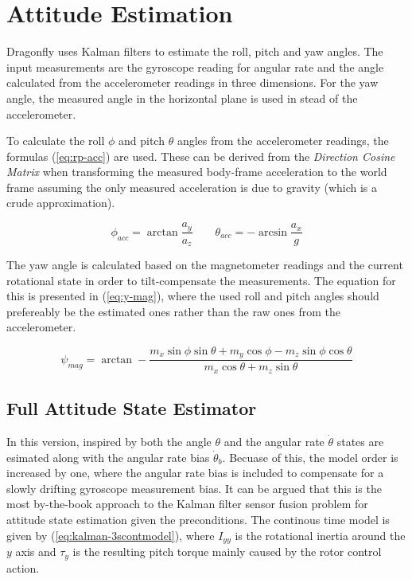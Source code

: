 \documentclass[a4paper]{report}
\begin{document}
	\section{Attitude Estimation}
Dragonfly uses Kalman filters to estimate the roll, pitch and yaw angles. The input measurements are the gyroscope reading for angular rate and the angle calculated from the accelerometer readings in three dimensions. For the yaw angle, the measured angle in the horizontal plane is used in stead of the accelerometer.

To calculate the roll $\phi$ and pitch $\theta$ angles from the accelerometer readings, the formulas (\ref{eq:rp-acc}) are used. These can be derived from the \emph{Direction Cosine Matrix} when transforming the measured body-frame acceleration to the world frame assuming the only measured acceleration is due to gravity (which is a crude approximation).

\begin{equation}
\label{eq:rp-acc}
\phi_{acc} = \arctan \dfrac{a_y}{a_z} \qquad \theta_{acc} = -\arcsin \dfrac{a_x}{g}
\end{equation}

The yaw angle is calculated based on the magnetometer readings and the current rotational state in order to tilt-compensate the measurements. The equation for this is presented in (\ref{eq:y-mag}), where the used roll and pitch angles should prefereably be the estimated ones rather than the raw ones from the accelerometer.

\begin{equation}
\label{eq:y-mag}
\psi_{mag} = \arctan - \dfrac{m_x \sin \phi \sin \theta + m_y \cos \phi - m_z \sin \phi \cos \theta}{m_x \cos \theta + m_z \sin \theta}
\end{equation}

	\subsection{Full Attitude State Estimator}

In this version, inspired by \cite{lhelgesson} both the angle $\theta$ and the angular rate $\dot{\theta}$ states are esimated along with the angular rate bias $\dot{\theta}_b$. Becuase of this, the model order is increased by one, where the angular rate bias is included to compensate for a slowly drifting gyroscope measurement bias. It can be argued that this is the most by-the-book approach to the Kalman filter sensor fusion problem for attitude state estimation given the preconditions. The continous time model is given by (\ref{eq:kalman-3scontmodel}), where $I_{yy}$ is the rotational inertia around the $y$ axis and $\tau_y$ is the resulting pitch torque mainly caused by the rotor control action.
\end{document}
